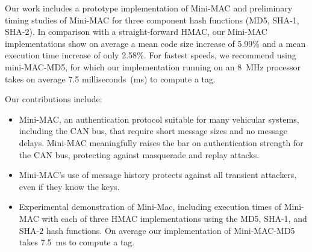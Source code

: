 Our work includes a prototype implementation of Mini-MAC and preliminary timing studies 
of Mini-MAC for three component hash functions (MD5, SHA-1, SHA-2).  
In comparison with a straight-forward HMAC, our Mini-MAC implementations show on average
a mean code size increase of 5.99\% and 
a mean execution time increase of only 2.58\%.
For fastest speeds, we recommend using mini-MAC-MD5, for which our implementation 
running on an 8~MHz processor takes on average 
7.5 milliseconds~(ms) to compute a tag.

Our contributions include:
\begin{itemize}

\item Mini-MAC, an authentication protocol suitable for many vehicular systems, including the CAN bus, 
that require short message sizes and no message delays.
Mini-MAC meaningfully raises the bar on authentication strength for the CAN bus, protecting against
masquerade and replay attacks.

\item Mini-MAC's use of message history protects against all transient attackers, 
even if they know the keys.

\item Experimental demonstration of Mini-Mac, including execution times of Mini-MAC 
with each of three HMAC implementations using the MD5, SHA-1, and SHA-2 hash functions. 
On average our implementation of Mini-MAC-MD5 takes 7.5~ms to compute a tag.

\end{itemize}
